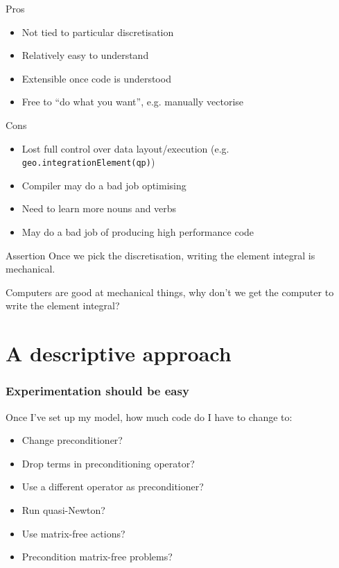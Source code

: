\documentclass[presentation]{beamer}
\begin{document}
\begin{frame}
  \begin{block}{Pros}
    \begin{itemize}
    \item Not tied to particular discretisation
    \item Relatively easy to understand
    \item Extensible once code is understood
    \item Free to ``do what you want'', e.g. manually vectorise
    \end{itemize}
  \end{block}
  \begin{block}{Cons}
    \begin{itemize}
    \item Lost full control over data layout/execution (e.g.
      \texttt{geo.integrationElement(qp)})
    \item Compiler may do a bad job optimising
    \item Need to learn more nouns and verbs
    \item May do a bad job of producing high performance code
    \end{itemize}
  \end{block}
\end{frame}

\begin{frame}[fragile]
  \begin{block}{Assertion}
    Once we pick the discretisation, writing the element integral is mechanical.
  \end{block}
  \begin{corollary}
    Computers are good at mechanical things, why don't we get the
    computer to write the element integral?
  \end{corollary}
\end{frame}

\section{A descriptive approach}

\begin{frame}
  \frametitle{Experimentation should be easy}
  Once I've set up my model, how much code do I have to change to:

  \begin{itemize}
  \item Change preconditioner?
  \item Drop terms in preconditioning operator?
  \item Use a different operator as preconditioner?
  \item Run quasi-Newton?
  \item Use matrix-free actions?
  \item Precondition matrix-free problems?
  \end{itemize}
\end{frame}
\end{document}
